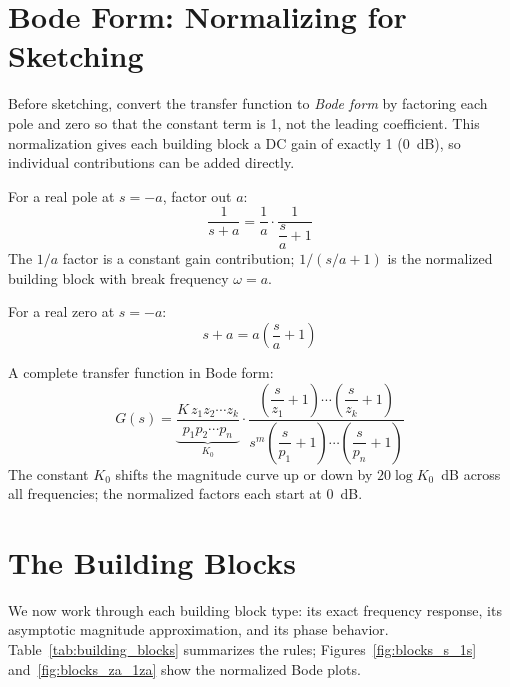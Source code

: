 \documentclass[12pt]{article}
\begin{document}
\section{Bode Form: Normalizing for Sketching}
\label{sec:bode_form}

Before sketching, convert the transfer function to \emph{Bode form} by
factoring each pole and zero so that the constant term is 1, not the leading
coefficient.  This normalization gives each building block a DC gain of exactly
1 (0~dB), so individual contributions can be added directly.

For a real pole at $s = -a$, factor out $a$:
\begin{equation}
  \frac{1}{s + a} = \frac{1}{a} \cdot \frac{1}{\dfrac{s}{a} + 1}
  \label{eq:bode_form_pole}
\end{equation}
The $1/a$ factor is a constant gain contribution; $1/(s/a + 1)$ is the
normalized building block with break frequency $\omega = a$.

For a real zero at $s = -a$:
\begin{equation}
  s + a = a\!\left(\frac{s}{a} + 1\right)
  \label{eq:bode_form_zero}
\end{equation}

A complete transfer function in Bode form:
\begin{equation}
  G(s) = \underbrace{\frac{K\,z_1 z_2\cdots z_k}{p_1 p_2\cdots p_n}}_{\displaystyle K_0}
  \cdot
  \frac{\left(\dfrac{s}{z_1}+1\right)\cdots\left(\dfrac{s}{z_k}+1\right)}
       {s^m\!\left(\dfrac{s}{p_1}+1\right)\cdots\left(\dfrac{s}{p_n}+1\right)}
  \label{eq:bode_form_general}
\end{equation}
The constant $K_0$ shifts the magnitude curve up or down by $20\log K_0$~dB
across all frequencies; the normalized factors each start at 0~dB.

\section{The Building Blocks}
\label{sec:blocks}

We now work through each building block type: its exact frequency response,
its asymptotic magnitude approximation, and its phase behavior.
Table~\ref{tab:building_blocks} summarizes the rules; Figures~\ref{fig:blocks_s_1s}
and~\ref{fig:blocks_za_1za} show the normalized Bode plots.
\end{document}
